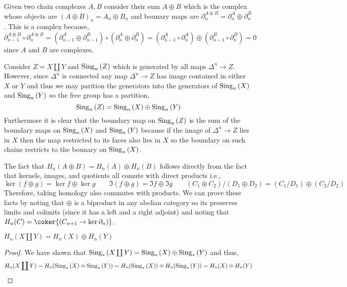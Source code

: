 \documentclass[12pt]{extarticle}
\begin{document}
\begin{exercise}
Given two chain complexes $A, B$ consider their sum $A \oplus B$ which is the complex whose objects are $(A \oplus B)_n = A_n \oplus B_n$ and bounary maps are $\partial^{A \oplus B}_n = \partial_n^A \oplus \partial_n^B$. This is a complex because,
\[ \partial^{A \oplus B}_{n-1} \circ \partial^{A \oplus B}_n = (\partial_{n-1}^A \oplus \partial_{n-1}^B) \circ (\partial_n^A \oplus \partial_n^B) = (\partial_{n-1}^A \circ \partial_n^A) \oplus (\partial_{n-1}^B \circ \partial_n^B) = 0 \]
since $A$ and $B$ are complexes. 
\end{exercise}

\begin{exercise}
Consider $Z = X \coprod Y$ and $\mathrm{Sing}_{n}\left( Z \right)$ which is generated by all maps $\Delta^n \to Z$. However, since $\Delta^n$ is connected any map $\Delta^n \to Z$ has image contained in either $X$ or $Y$ and thus we may parition the generators into the generators of $\mathrm{Sing}_{n}\left( X \right)$ and $\mathrm{Sing}_{n}\left( Y \right)$ so the free group has a partition,
\[ \mathrm{Sing}_{n}\left( Z \right) = \mathrm{Sing}_{n}\left( X \right) \oplus \mathrm{Sing}_{n}\left( Y \right) \]
Furthermore it is clear that the boundary map on $\mathrm{Sing}_{n}\left( Z \right)$ is the sum of the boundary maps on $\mathrm{Sing}_{n}\left( X \right)$ and $\mathrm{Sing}_{n}\left( Y \right)$ because if the image of $\Delta^n \to Z$ lies in $X$ then the map restricted to its faces also lies in $X$ so the boundary on such chains restricts to the bounary on $\mathrm{Sing}_{n}\left( X \right)$. 
\end{exercise}

\begin{exercise}
The fact that $H_n(A \oplus B) = H_n(A) \oplus H_n(B)$ follows directly from the fact that kernels, images, and quotients all comute with direct products i.e.,
\[ \ker{(f \oplus g)} = \ker{f} \oplus \ker{g} \quad \quad \Im{(f \oplus g)} = \Im{f} \oplus \Im{g} \quad \quad (C_1 \oplus C_2)/(D_1 \oplus D_2) = (C_1 / D_1) \oplus (C_2 / D_2) \]
Therefore, taking homology also commutes with products. We can prove these facts by noting that $\oplus$ is a biproduct in any abelian category so its preserves limits and colimits (since it has a left and a right adjoint) and noting that $H_n(C) = \coker{(C_{n+1} \to \ker{\partial_n})}$. 
\end{exercise}

\begin{proposition}
$H_n(X \coprod Y) = H_n(X) \oplus H_n(Y)$
\end{proposition}

\begin{proof}
We have shown that $\mathrm{Sing}_{*}\left( X \coprod Y \right) = \mathrm{Sing}_{*}\left( X \right) \oplus \mathrm{Sing}_{*}\left( Y \right)$ and thus,
\[ H_n(X \coprod Y) = H_n(\mathrm{Sing}_{*}\left( X \right) \oplus \mathrm{Sing}_{*}\left( Y \right)) = H_n(\mathrm{Sing}_{*}\left( X \right)) \oplus H_n(\mathrm{Sing}_{*}\left( Y \right)) = H_n(X) \oplus H_n(Y) \]
\end{proof}
\end{document}
